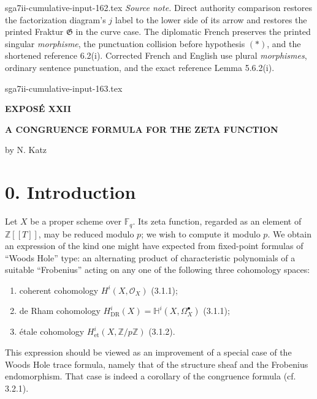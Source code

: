 \begin{filecontents*}{sga7ii-cumulative-input-162.tex}
\medskip
\noindent\emph{Source note.}
Direct authority comparison restores the factorization diagram's $j$ label
to the lower side of its arrow and restores the printed Fraktur
$\mathfrak G$ in the curve case.  The diplomatic French preserves the
printed singular \emph{morphisme}, the punctuation collision before
hypothesis $(*)$, and the shortened reference 6.2(i).  Corrected French and
English use plural \emph{morphismes}, ordinary sentence punctuation, and the
exact reference Lemma 5.6.2(i).
\end{filecontents*}
\begin{filecontents*}{sga7ii-cumulative-input-163.tex}
\clearpage
\begin{center}
{\Large\bfseries EXPOSÉ XXII}\par
\vspace{1.5cm}
{\Large\bfseries A CONGRUENCE FORMULA FOR THE ZETA FUNCTION}\par
\vspace{0.8cm}
{\large by N. Katz}\par
\end{center}

\vspace{1.5cm}
\section*{0. Introduction}

Let $X$ be a proper scheme over $\mathbb F_q$. Its zeta function, regarded as
an element of $\mathbb Z[[T]]$, may be reduced modulo $p$; we wish to compute
it modulo $p$. We obtain an expression of the kind one might have expected
from fixed-point formulas of ``Woods Hole'' type: an alternating product of
characteristic polynomials of a suitable ``Frobenius'' acting on any one of
the following three cohomology spaces:

\begin{enumerate}[label=\arabic*)]
\item coherent cohomology $H^i(X,\mathcal O_X)$ (3.1.1);
\item de Rham cohomology
  $H^i_{\mathrm{DR}}(X)=\mathbb H^i(X,\Omega_X^\bullet)$ (3.1.1);
\item étale cohomology $H^i_{\mathrm{et}}(X,\mathbb Z/p\mathbb Z)$ (3.1.2).
\end{enumerate}

This expression should be viewed as an improvement of a special case of the
Woods Hole trace formula, namely that of the structure sheaf and the
Frobenius endomorphism. That case is indeed a corollary of the congruence
formula (cf. 3.2.1).


\end{filecontents*}
